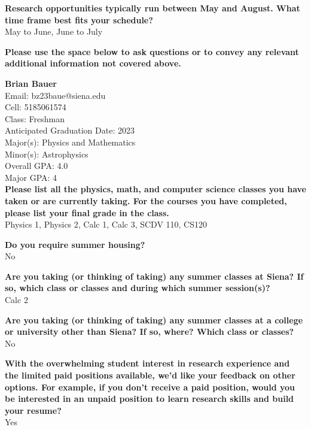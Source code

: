\documentclass[12pt,preprint]{aastex}
\begin{document}
\vspace*{3mm}
{\bf Research opportunities typically run between May and August.  What time frame best fits your schedule?}\\
May to June, June to July

\vspace*{3mm}
{\bf Please use the space below to ask questions or to convey any relevant additional information not covered above.}\\
\vspace*{3mm}

\vspace*{3mm}
\clearpage
{\large {\bf Brian Bauer}}\\
Email: bz23baue@siena.edu\\
Cell: 5185061574\\
Class: Freshman\\
Anticipated Graduation Date: 2023\\
Major(s): Physics and Mathematics\\
Minor(s): Astrophysics\\
Overall GPA: 4.0\\
Major GPA: 4\\

 \vspace*{1mm}
{\bf Please list all the physics, math, and computer science classes you have taken or are currently taking.  For the courses you have completed, please list your final grade in the class.}\\
Physics 1, Physics 2, Calc 1, Calc 3, SCDV 110, CS120

\vspace*{3mm}
{\bf Do you require summer housing?}\\
No

\vspace*{3mm}
{\bf Are you taking (or thinking of taking) any summer classes at Siena?  If so, which class or classes and during which summer session(s)?}\\
Calc 2

\vspace*{3mm}
{\bf Are you taking (or thinking of taking) any summer classes at a college or university other than Siena?  If so, where?  Which class or classes?}\\
No

\vspace*{3mm}
{\bf With the overwhelming student interest in research experience and the limited paid positions available, we'd like your feedback on other options.  For example, if you don't receive a paid position, would you be interested in an unpaid position to learn research skills and build your resume?}\\
Yes
\end{document}
